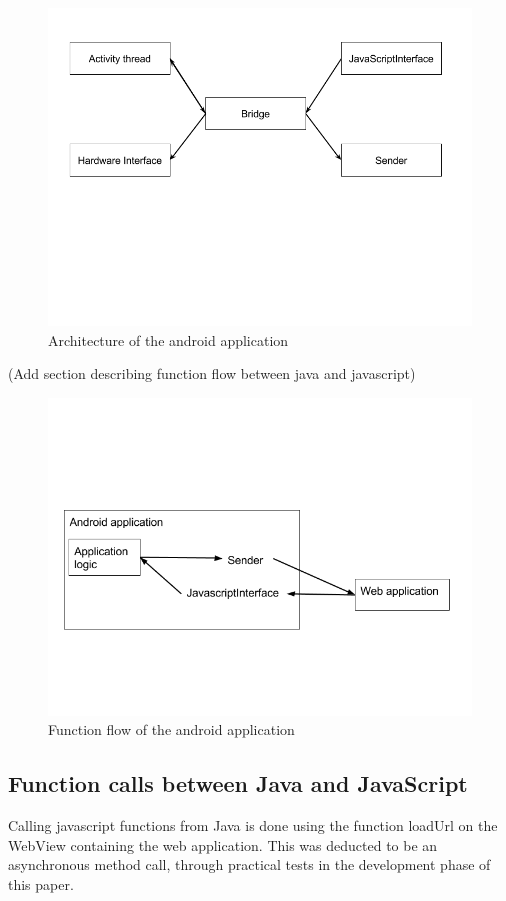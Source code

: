 \begin{figure}[ht!]
    \centering
    \includegraphics[width=120mm,natwidth=800,natheight=600]{./img/androidStructure.png}
    \caption{Architecture of the android application\label{caption-android-architecture}}
\end{figure}


(Add section describing function flow between java and javascript)

\begin{figure}[ht!]
    \centering
    \includegraphics[width=120mm,natwidth=720,natheight=540]{./img/androidFlow.png}
    \caption{Function flow of the android application\label{caption-android-flow}}
\end{figure}

\subsection{Function calls between Java and JavaScript}
Calling javascript functions from Java is done using the function loadUrl on the WebView containing the web application. This was deducted to be an asynchronous method call, through practical tests in the development phase of this paper. 

